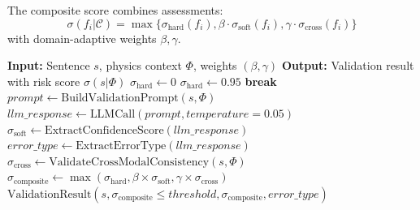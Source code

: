\documentclass{uai2026} %
\theoremstyle{remark}
\theoremstyle{plain}
\theoremstyle{definition}
\begin{document}
The composite score combines assessments: 
$$\sigma(f_i | \mathcal{C}) = \max\{\sigma_{\text{hard}}(f_i), \beta \cdot \sigma_{\text{soft}}(f_i), \gamma \cdot \sigma_{\text{cross}}(f_i)\}$$
with domain-adaptive weights $\beta, \gamma$.
\begin{algorithm} \caption{Scientific Sentence Validation} \label{alg:validation} \begin{algorithmic}[1] \STATE \textbf{Input:} Sentence $s$, physics context $\Phi$, weights $(\beta, \gamma)$ \STATE \textbf{Output:} Validation result with risk score $\sigma(s|\Phi)$ \STATE {} \STATE $\sigma_{\text{hard}} \leftarrow 0$   \STATE $\sigma_{\text{hard}} \leftarrow 0.95$  \STATE \textbf{break} \ENDIF \ENDFOR \STATE {} \STATE $prompt \leftarrow \text{BuildValidationPrompt}(s, \Phi)$ \STATE $llm\_response \leftarrow \text{LLMCall}(prompt, temperature=0.05)$ \STATE $\sigma_{\text{soft}} \leftarrow \text{ExtractConfidenceScore}(llm\_response)$ \STATE $error\_type \leftarrow \text{ExtractErrorType}(llm\_response)$ \STATE {} \STATE $\sigma_{\text{cross}} \leftarrow \text{ValidateCrossModalConsistency}(s, \Phi)$ \STATE {} \STATE $\sigma_{\text{composite}} \leftarrow \max(\sigma_{\text{hard}}, \beta \times \sigma_{\text{soft}}, \gamma \times \sigma_{\text{cross}})$ \RETURN $\text{ValidationResult}(s, \sigma_{\text{composite}} \leq threshold, \sigma_{\text{composite}}, error\_type)$ \end{algorithmic} \end{algorithm}
       
\end{document}
